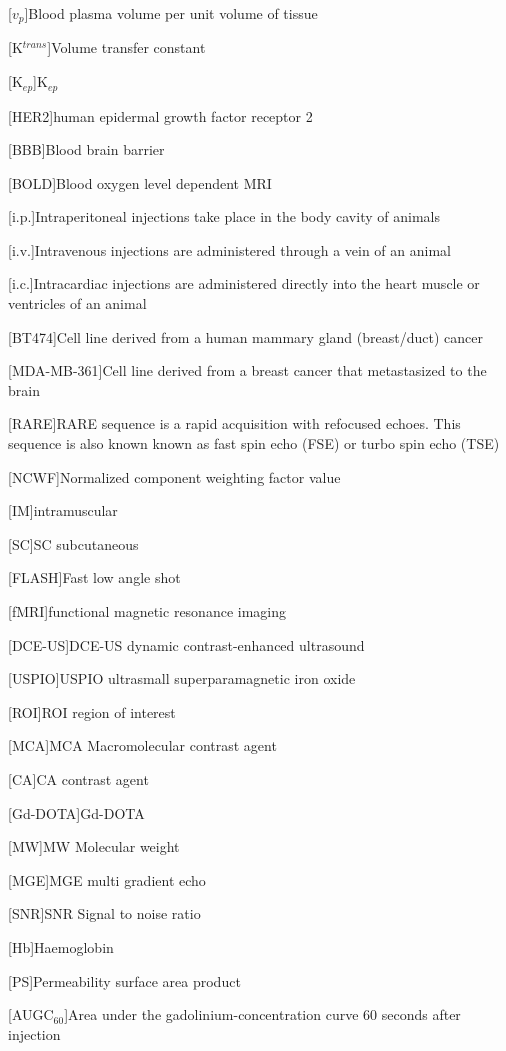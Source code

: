 \begin{acronym}
[$v_p$]{Blood plasma volume per unit volume of tissue}

[K$^{trans}$]{Volume transfer constant}

[K$_{ep}$]{K$_{ep}$}

[HER2]{human epidermal growth factor receptor 2}

[BBB]{Blood brain barrier}

[BOLD]{Blood oxygen level dependent MRI}

[i.p.]{Intraperitoneal injections take place in the body cavity of animals}

[i.v.]{Intravenous injections are administered through a vein of an animal}

[i.c.]{Intracardiac injections are administered directly into the heart muscle or ventricles of an animal}

[BT474]{Cell line derived from a human mammary gland (breast/duct) cancer}

[MDA-MB-361]{Cell line derived from a breast cancer that metastasized to the brain}

[RARE]{RARE sequence is a rapid acquisition with refocused echoes. This sequence is also known known as fast spin echo (FSE) or turbo spin echo (TSE)}

[NCWF]{Normalized component weighting factor value}

[IM]{intramuscular}

[SC]{SC subcutaneous}

[FLASH]{Fast low angle shot}

[fMRI]{functional magnetic resonance imaging}

[DCE-US]{DCE-US dynamic contrast-enhanced ultrasound}

[USPIO]{USPIO ultrasmall superparamagnetic iron oxide}

[ROI]{ROI region of interest}

[MCA]{MCA Macromolecular contrast agent}

[CA]{CA contrast agent}

[Gd-DOTA]{Gd-DOTA}

[MW]{MW Molecular weight}

[MGE]{MGE multi gradient echo}

[SNR]{SNR Signal to noise ratio}

[Hb]{Haemoglobin}

[PS]{Permeability surface area product}

[AUGC$_{60}$]{Area under the gadolinium-concentration curve 60 seconds after injection}

\end{acronym}

